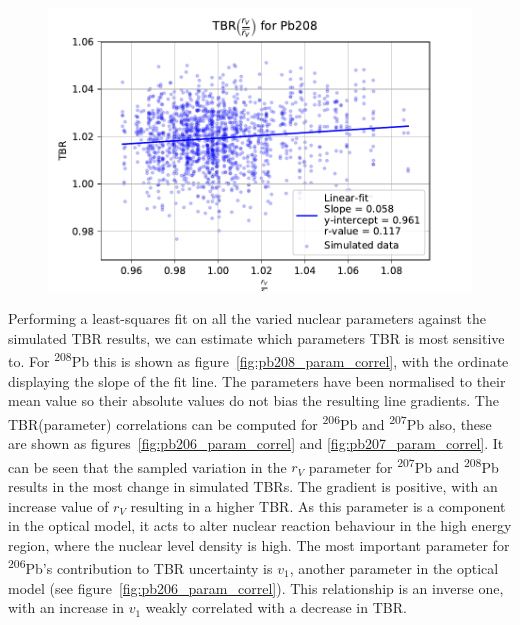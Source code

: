 \begin{figure}[H]
	\includegraphics[width=\textwidth]{Pb208_rvadjust}
	\caption{}
	\label{fig:pb208_rvadjust}
\end{figure}

Performing a least-squares fit on all the varied nuclear parameters against the simulated TBR results, we can estimate which parameters TBR is most sensitive to. For \textsuperscript{208}Pb this is shown as figure~\ref{fig:pb208_param_correl}, with the ordinate displaying the slope of the fit line. The parameters have been normalised to their mean value so their absolute values do not bias the resulting line gradients. The TBR(parameter) correlations can be computed for \textsuperscript{206}Pb and \textsuperscript{207}Pb also, these are shown as figures~\ref{fig:pb206_param_correl} and \ref{fig:pb207_param_correl}. It can be seen that the sampled variation in the $r_{V}$ parameter for \textsuperscript{207}Pb and \textsuperscript{208}Pb results in the most change in simulated TBRs. The gradient is positive, with an increase value of $r_{V}$ resulting in a higher TBR. As this parameter is a component in the optical model, it acts to alter nuclear reaction behaviour in the high energy region, where the nuclear level density is high. The most important parameter for \textsuperscript{206}Pb's contribution to TBR uncertainty is $v_{1}$, another parameter in the optical model (see figure~\ref{fig:pb206_param_correl}). This relationship is an inverse one, with an increase in $v_{1}$ weakly correlated with a decrease in TBR. 

